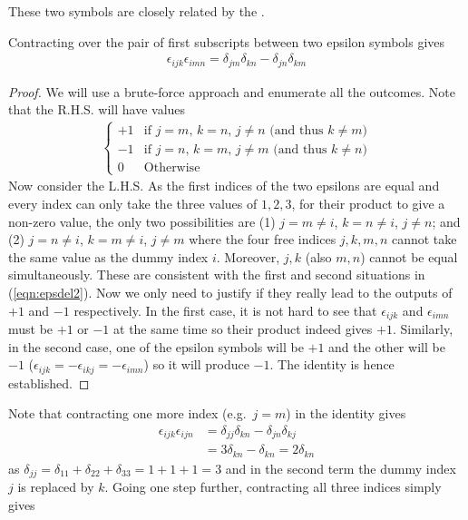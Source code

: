 These two symbols are closely related by the .
\begin{proper} 
\label{proper:epsdel} Contracting over the pair of first subscripts between two epsilon symbols gives 
\begin{align}
\epsilon_{ijk}\epsilon_{imn} = \delta_{jm}\delta_{kn} - \delta_{jn}\delta_{km} \label{eqn:epsdel}
\end{align}
\end{proper}
\begin{proof}
We will use a brute-force approach and enumerate all the outcomes. Note that the R.H.S. will have values 
\begin{align}
\begin{cases}
+1 & \text{if $j=m$, $k=n$, $j\neq n$ (and thus $k\neq m$)} \\
-1 & \text{if $j=n$, $k=m$, $j\neq m$ (and thus $k\neq n$)} \\
0 & \text{Otherwise}
\end{cases}
\label{eqn:epsdel2}
\end{align}
Now consider the L.H.S. As the first indices of the two epsilons are equal and every index can only take the three values of $1,2,3$, for their product to give a non-zero value, the only two possibilities are (1) $j = m \neq i$, $k = n \neq i$, $j \neq n$; and (2) $j = n \neq i$, $k = m \neq i$, $j \neq m$ where the four free indices $j,k,m,n$ cannot take the same value as the dummy index $i$. Moreover, $j,k$ (also $m,n$) cannot be equal simultaneously. These are consistent with the first and second situations in (\ref{eqn:epsdel2}). Now we only need to justify if they really lead to the outputs of $+1$ and $-1$ respectively. In the first case, it is not hard to see that $\epsilon_{ijk}$ and $\epsilon_{imn}$ must be $+1$ or $-1$ at the same time so their product indeed gives $+1$. Similarly, in the second case, one of the epsilon symbols will be $+1$ and the other will be $-1$ ($\epsilon_{ijk} = -\epsilon_{ikj} = -\epsilon_{imn}$) so it will produce $-1$. The identity is hence established.
\end{proof}
Note that contracting one more index (e.g.\ $j=m$) in the identity gives
\begin{align}
\epsilon_{ijk}\epsilon_{ijn} &= \delta_{jj}\delta_{kn} - \delta_{jn}\delta_{kj} \nonumber \\
&= 3\delta_{kn} - \delta_{kn} = 2\delta_{kn}
\end{align}
as $\delta_{jj} = \delta_{11} + \delta_{22} + \delta_{33} = 1+1+1 = 3$ and in the second term the dummy index $j$ is replaced by $k$. Going one step further, contracting all three indices simply gives
